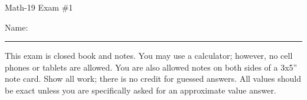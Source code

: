 \documentclass[letterpaper,12pt,fleqn]{article}
\begin{document}
\begin{center}
\Large Math-19 Exam \#1
\end{center}

\vspace{0.25in}

Name: \rule{4in}{1pt}

\vspace{0.25in}

This exam is closed book and notes. You may use a calculator; however, no cell
phones or tablets are allowed. You are also allowed notes on both sides of a
3x5'' note card. Show all work; there is no credit for guessed answers. All
values should be exact unless you are specifically asked for an approximate
value answer.

\vspace{0.25in}

\newcommand{\fillin}{\rule{2in}{1pt}}
\newcommand{\sfillin}{\rule{0.5in}{1pt}}
\end{document}
